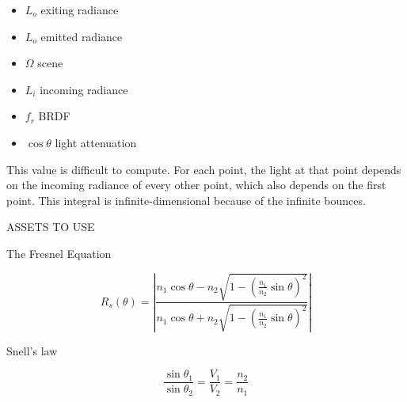 \documentclass{article}
\begin{document}
\begin{itemize}
    \item \(L_o\) exiting radiance
    \item \(L_o\) emitted radiance
    \item \(\Omega\) scene
    \item \(L_i\) incoming radiance
    \item \(f_r\) BRDF
    \item \(\cos \theta\) light attenuation
\end{itemize}

This value is difficult to compute. For each point, the light at that point
depends on the incoming radiance of every other point, which also depends on the first point.
This integral is infinite-dimensional because of the infinite bounces.


\pagebreak

ASSETS TO USE


The Fresnel Equation

\[
    R_s(\theta) =
        \left|
            \frac
            {
                n_1\cos \theta - n_2 \sqrt{1-{\left(\frac{n_1}{n_2}\sin \theta\right)}^2}
            }
            {
                n_1\cos \theta + n_2 \sqrt{1-{\left(\frac{n_1}{n_2}\sin \theta\right)}^2}
            }
        \right|
\]

Snell's law

\[
    \frac{\sin \theta_1}{\sin \theta_2}
    = \frac{V_1}{V_2}
    = \frac{n_2}{n_1}
\]

\pagebreak

\nocite{*} %

\printbibliography
\end{document}
